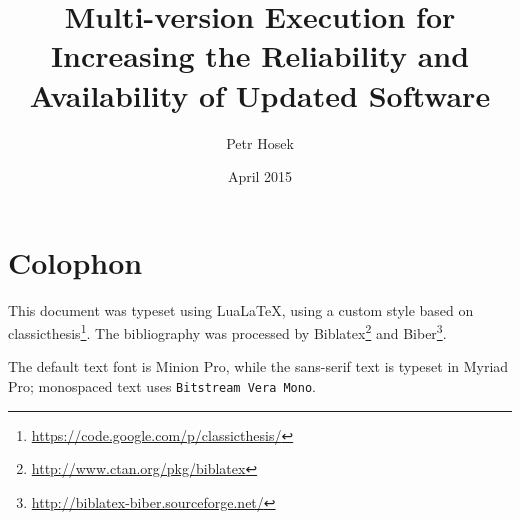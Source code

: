 \documentclass[a4paper,12pt,oneside,minionpro,dottedtoc]{thesis}
\title{Multi-version Execution for Increasing the Reliability and Availability of Updated Software}
\author{Petr Hosek}
\date{April 2015}
\begin{document}
\let\question\savedquestion

\maketitle

\null
\vfill
{}
\section*{Colophon}

This document was typeset using Lua\LaTeX, using a custom style based on
\textsf{classicthesis}\footnote{\url{https://code.google.com/p/classicthesis/}}.
The bibliography was processed by
Biblatex\footnote{\url{http://www.ctan.org/pkg/biblatex}} and
Biber\footnote{\url{http://biblatex-biber.sourceforge.net/}}.

The default text font is Minion Pro, while the sans-serif text is typeset in
\textsf{Myriad Pro}; monospaced text uses \texttt{Bitstream Vera Mono}.
\end{document}
